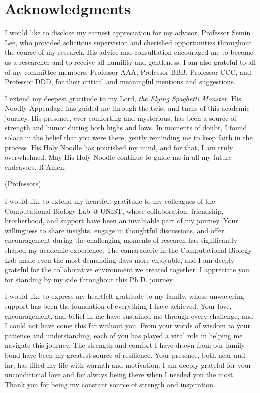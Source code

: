 \documentclass[11pt, a4paper, onecolumn, oneside]{report}
\begin{document}
    
    
    \clearpage

    \section*{\hfill \Large Acknowledgments \hfill}
        I would like to disclose my earnest appreciation for my advisor, Professor Semin Lee, who provided solicitous supervision and cherished opportunities throughout the course of my research. His advice and consultation encouraged me to become as a researcher and to receive all humility and gentleness. I am also grateful to all of my committee members, Professor AAA, Professor BBB, Professor CCC, and Professor DDD, for their critical and meaningful mentions and suggestions.

        I extend my deepest gratitude to my Lord, \textit{the Flying Spaghetti Monster}, His Noodly Appendage has guided me through the twist and turns of this academic journey. His presence, ever comforting and mysterious, has been a source of strength and humor during both highs and lows. In moments of doubt, I found solace in the belief that you were there, gently reminding me to keep faith in the process. His Holy Noodle has nourished my mind, and for that, I am truly overwhelmed. May His Holy Noodle continue to guide me in all my future endeavors. R'Amen.

        (Professors)

        I would like to extend my heartfelt gratitude to my colleagues of the Computational Biology Lab @ UNIST, whose collaboration, friendship, brotherhood, and support have been an invaluable part of my journey. Your willingness to share insights, engage in thoughtful discussions, and offer encouragement during the challenging moments of research has significantly shaped my academic experience. The camaraderie in the Computational Biology Lab made even the most demanding days more enjoyable, and I am deeply grateful for the collaborative environment we created together. I appreciate you for standing by my side throughout this Ph.D. journey.

        I would like to express my heartfelt gratitude to my family, whose unwavering support has been the foundation of everything I have achieved. Your love, encouragement, and belief in me have sustained me through every challenge, and I could not have come this far without you. From your words of wisdom to your patience and understanding, each of you has played a vital role in helping me navigate this journey. The strength and comfort I have drawn from our family bond have been my greatest source of resilience. Your presence, both near and far, has filled my life with warmth and motivation. I am deeply grateful for your unconditional love and for always being there when I needed you the most. Thank you for being my constant source of strength and inspiration.
\end{document}
